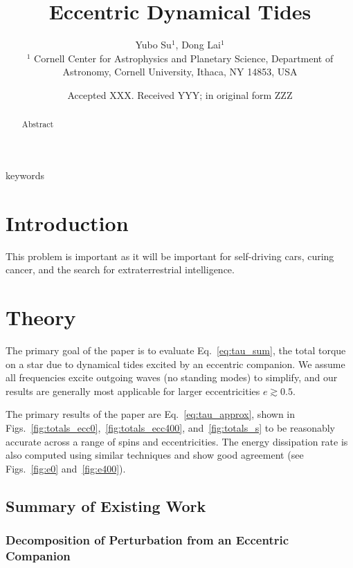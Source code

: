 \documentclass[
        fleqn,
        usenatbib,
        referee,
    ]{mnras}
\title[Eccentric Dynamical Tides]{Eccentric Dynamical Tides}
\author[Y. Su, D. Lai.]{
Yubo Su$^1$,
Dong Lai$^1$
\\
$^1$ Cornell Center for Astrophysics and Planetary Science, Department of
Astronomy, Cornell University, Ithaca, NY 14853, USA
}
\date{Accepted XXX\@. Received YYY\@; in original form ZZZ}
\begin{document}
\label{firstpage}
\pagerange{\pageref{firstpage}--\pageref{lastpage}}
\maketitle

\begin{abstract}
    Abstract
\end{abstract}

\begin{keywords}
keywords %
\end{keywords}

\section{Introduction}

This problem is important as it will be important for self-driving cars, curing
cancer, and the search for extraterrestrial intelligence.

\section{Theory}

The primary goal of the paper is to evaluate Eq.~\eqref{eq:tau_sum}, the total
torque on a star due to dynamical tides excited by an eccentric companion. We
assume all frequencies excite outgoing waves (no standing modes) to simplify,
and our results are generally most applicable for larger eccentricities $e
\gtrsim 0.5$.

The primary results of the paper are Eq.~\eqref{eq:tau_approx}, shown in
Figs.~\ref{fig:totals_ecc0},~\ref{fig:totals_ecc400},
and~\ref{fig:totals_s} to be reasonably accurate across a range of spins
and eccentricities. The energy dissipation rate is also computed using similar
techniques and show good agreement (see Figs.~\ref{fig:e0}
and~\ref{fig:e400}).

\subsection{Summary of Existing Work}

\subsubsection{Decomposition of Perturbation from an Eccentric Companion}
\end{document}

